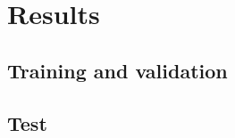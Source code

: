 
\section{Results}
\label{sec:results}

\subsection{Training and validation}

\subsection{Test}




